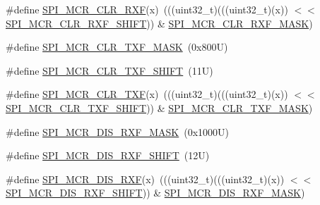 \begin{DoxyCompactItemize}
\item 
\#define \mbox{\hyperlink{group___c_a_n___register___masks_gaae3c74d637272a70177d20cfde606d6d}{S\+P\+I\+\_\+\+M\+C\+R\+\_\+\+C\+L\+R\+\_\+\+R\+XF}}(x)~(((uint32\+\_\+t)(((uint32\+\_\+t)(x)) $<$$<$ \mbox{\hyperlink{group___c_a_n___register___masks_gae1f4b01eb27f199a893e42f6a3d3edb7}{S\+P\+I\+\_\+\+M\+C\+R\+\_\+\+C\+L\+R\+\_\+\+R\+X\+F\+\_\+\+S\+H\+I\+FT}})) \& \mbox{\hyperlink{group___c_a_n___register___masks_gaedd370380f06f2e4bf2ca01babda8732}{S\+P\+I\+\_\+\+M\+C\+R\+\_\+\+C\+L\+R\+\_\+\+R\+X\+F\+\_\+\+M\+A\+SK}})
\item 
\#define \mbox{\hyperlink{group___c_a_n___register___masks_ga5b57559246a1a4c32c53542e9f0ea2cb}{S\+P\+I\+\_\+\+M\+C\+R\+\_\+\+C\+L\+R\+\_\+\+T\+X\+F\+\_\+\+M\+A\+SK}}~(0x800\+U)
\item 
\#define \mbox{\hyperlink{group___c_a_n___register___masks_ga0f0a133d00c115835f0b50c334c104cf}{S\+P\+I\+\_\+\+M\+C\+R\+\_\+\+C\+L\+R\+\_\+\+T\+X\+F\+\_\+\+S\+H\+I\+FT}}~(11\+U)
\item 
\#define \mbox{\hyperlink{group___c_a_n___register___masks_ga3556df040389407ff335eb2c0829231a}{S\+P\+I\+\_\+\+M\+C\+R\+\_\+\+C\+L\+R\+\_\+\+T\+XF}}(x)~(((uint32\+\_\+t)(((uint32\+\_\+t)(x)) $<$$<$ \mbox{\hyperlink{group___c_a_n___register___masks_ga0f0a133d00c115835f0b50c334c104cf}{S\+P\+I\+\_\+\+M\+C\+R\+\_\+\+C\+L\+R\+\_\+\+T\+X\+F\+\_\+\+S\+H\+I\+FT}})) \& \mbox{\hyperlink{group___c_a_n___register___masks_ga5b57559246a1a4c32c53542e9f0ea2cb}{S\+P\+I\+\_\+\+M\+C\+R\+\_\+\+C\+L\+R\+\_\+\+T\+X\+F\+\_\+\+M\+A\+SK}})
\item 
\#define \mbox{\hyperlink{group___c_a_n___register___masks_ga27dfc23fb0551340c07676e7092267d4}{S\+P\+I\+\_\+\+M\+C\+R\+\_\+\+D\+I\+S\+\_\+\+R\+X\+F\+\_\+\+M\+A\+SK}}~(0x1000\+U)
\item 
\#define \mbox{\hyperlink{group___c_a_n___register___masks_gaea17770537c6e387ed266e662f5e9d49}{S\+P\+I\+\_\+\+M\+C\+R\+\_\+\+D\+I\+S\+\_\+\+R\+X\+F\+\_\+\+S\+H\+I\+FT}}~(12\+U)
\item 
\#define \mbox{\hyperlink{group___c_a_n___register___masks_gabef7124a5c4ecb95b364f88d8e98cefc}{S\+P\+I\+\_\+\+M\+C\+R\+\_\+\+D\+I\+S\+\_\+\+R\+XF}}(x)~(((uint32\+\_\+t)(((uint32\+\_\+t)(x)) $<$$<$ \mbox{\hyperlink{group___c_a_n___register___masks_gaea17770537c6e387ed266e662f5e9d49}{S\+P\+I\+\_\+\+M\+C\+R\+\_\+\+D\+I\+S\+\_\+\+R\+X\+F\+\_\+\+S\+H\+I\+FT}})) \& \mbox{\hyperlink{group___c_a_n___register___masks_ga27dfc23fb0551340c07676e7092267d4}{S\+P\+I\+\_\+\+M\+C\+R\+\_\+\+D\+I\+S\+\_\+\+R\+X\+F\+\_\+\+M\+A\+SK}})
\item 
$$
\end{DoxyCompactItemize}
